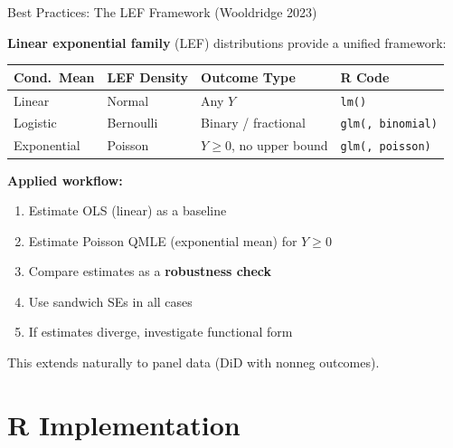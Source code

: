 \documentclass[aspectratio=169]{beamer}
\numberwithin{equation}{section}
\begin{document}
\begin{frame}{Best Practices: The LEF Framework (Wooldridge 2023)}

\textbf{Linear exponential family} (LEF) distributions provide a unified framework:

\bigskip

\renewcommand{\arraystretch}{1.4}
\begin{tabular}{llll}
\toprule
\textbf{Cond.\ Mean} & \textbf{LEF Density} & \textbf{Outcome Type} & \textbf{R Code} \\
\midrule
Linear & Normal & Any $Y$ & \texttt{lm()} \\
Logistic & Bernoulli & Binary / fractional & \texttt{glm(, binomial)} \\
Exponential & Poisson & $Y \geq 0$, no upper bound & \texttt{glm(, poisson)} \\
\bottomrule
\end{tabular}
\renewcommand{\arraystretch}{1.0}

\pause

\bigskip

\textbf{Applied workflow:}
\begin{enumerate}
    \item Estimate OLS (linear) as a baseline
    \item Estimate Poisson QMLE (exponential mean) for $Y \geq 0$
    \item Compare estimates as a \textbf{robustness check}
    \item Use sandwich SEs in all cases
    \item If estimates diverge, investigate functional form
\end{enumerate}

\pause

\bigskip

This extends naturally to panel data (DiD with nonneg outcomes).

\end{frame}

\section{R Implementation}
\end{document}
